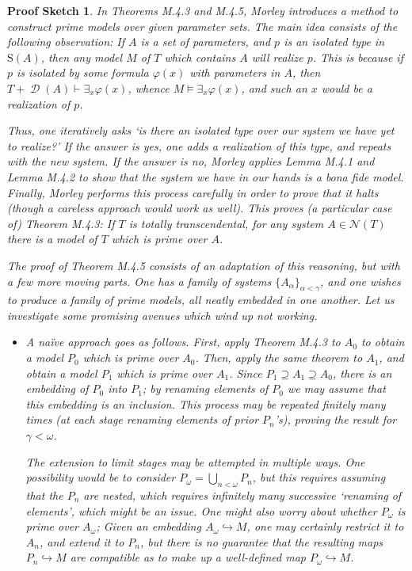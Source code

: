 \documentclass{article}
\theoremstyle{nonumberplain}
\newtheorem{sketch}{Proof Sketch}
\newcommand{\calN}{\mathcal{N}}
\newcommand{\Stone}{\mathrm{S}}
\DeclareMathOperator{\ADG}{\mathcal{D}}
\begin{document}
\begin{sketch}
In Theorems M.4.3 and M.4.5, Morley introduces a method to construct prime models over given parameter sets. The main idea consists of the following observation: If $A$ is a set of parameters, and $p$ is an isolated type in $\Stone(A)$, then any model $M$ of $T$ which contains $A$ will realize $p$. This is because if $p$ is isolated by some formula $\varphi(x)$ with parameters in $A$, then $T + \ADG(A) \vdash \exists_x \varphi(x)$, whence $M \vDash \exists_x \varphi(x)$, and such an $x$ would be a realization of $p$.

Thus, one iteratively asks `is there an isolated type over our system we have yet to realize?' If the answer is yes, one adds a realization of this type, and repeats with the new system. If the answer is no, Morley applies Lemma M.4.1 and Lemma M.4.2 to show that the system we have in our hands is a \textit{bona fide} model. Finally, Morley performs this process carefully in order to prove that it halts (though a careless approach would work as well). This proves (a particular case of) Theorem M.4.3: If $T$ is totally transcendental, for any system $A \in \calN(T)$ there is a model of $T$ which is prime over $A$.

The proof of Theorem M.4.5 consists of an adaptation of this reasoning, but with a few more moving parts. One has a family of systems $\{A_\alpha\}_{\alpha < \gamma}$, and one wishes to produce a family of prime models, all neatly embedded in one another. Let us investigate some promising avenues which wind up not working.

\begin{itemize}
\item A naïve approach goes as follows. First, apply Theorem M.4.3 to $A_0$ to obtain a model $P_0$ which is prime over $A_0$. Then, apply the same theorem to $A_1$, and obtain a model $P_1$ which is prime over $A_1$. Since $P_1 \supseteq A_1 \supseteq A_0$, there is an embedding of $P_0$ into $P_1$; by renaming elements of $P_0$ we may assume that this embedding is an inclusion. This process may be repeated finitely many times (at each stage renaming elements of prior $P_n$'s), proving the result for $\gamma < \omega$.

The extension to limit stages may be attempted in multiple ways. One possibility would be to consider $P_\omega = \bigcup_{n<\omega} P_n$, but this requires assuming that the $P_n$ are nested, which requires infinitely many successive `renaming of elements', which might be an issue. One might also worry about whether $P_\omega$ is prime over $A_\omega$; Given an embedding $A_\omega \hookrightarrow M$, one may certainly restrict it to $A_n$, and extend it to $P_n$, but there is no guarantee that the resulting maps $P_n \hookrightarrow M$ are compatible as to make up a well-defined map $P_\omega \hookrightarrow M$.


\end{itemize}
\end{sketch}
\end{document}
